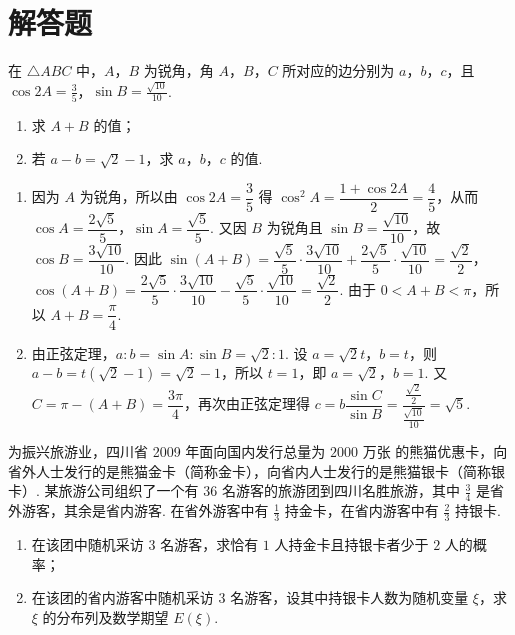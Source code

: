 \section{解答题}

\begin{problem}
在 \(\triangle ABC\) 中，\(A\)，\(B\) 为锐角，角 \(A\)，\(B\)，\(C\) 所对应的边分别为 \(a\)，\(b\)，\(c\)，且 \(\cos 2A = \frac{3}{5}\)，\(\sin B = \frac{\sqrt{10}}{10}\).

\begin{enumerate}
\item 求 \(A + B\) 的值；
\item 若 \(a - b = \sqrt{2} - 1\)，求 \(a\)，\(b\)，\(c\) 的值.
\end{enumerate}
\end{problem}

\begin{solution}
\begin{enumerate}
\item 因为 \(A\) 为锐角，所以由 \(\cos 2A=\dfrac35\) 得 \(\cos^2A=\dfrac{1+\cos2A}{2}=\dfrac45\)，从而 \(\cos A=\dfrac{2\sqrt5}{5}\)，\(\sin A=\dfrac{\sqrt5}{5}\). 又因 \(B\) 为锐角且 \(\sin B=\dfrac{\sqrt{10}}{10}\)，故 \(\cos B=\dfrac{3\sqrt{10}}{10}\). 因此 \(\sin(A+B)=\dfrac{\sqrt5}{5}\cdot\dfrac{3\sqrt{10}}{10}+\dfrac{2\sqrt5}{5}\cdot\dfrac{\sqrt{10}}{10}=\dfrac{\sqrt2}{2}\)，\(\cos(A+B)=\dfrac{2\sqrt5}{5}\cdot\dfrac{3\sqrt{10}}{10}-\dfrac{\sqrt5}{5}\cdot\dfrac{\sqrt{10}}{10}=\dfrac{\sqrt2}{2}\). 由于 \(0<A+B<\pi\)，所以 \(A+B=\dfrac{\pi}{4}\).
\item 由正弦定理，\(a:b=\sin A:\sin B=\sqrt2:1\). 设 \(a=\sqrt2t\)，\(b=t\)，则 \(a-b=t(\sqrt2-1)=\sqrt2-1\)，所以 \(t=1\)，即 \(a=\sqrt2\)，\(b=1\). 又 \(C=\pi-(A+B)=\dfrac{3\pi}{4}\)，再次由正弦定理得 \(c=b\dfrac{\sin C}{\sin B}=\dfrac{\frac{\sqrt2}{2}}{\frac{\sqrt{10}}{10}}=\sqrt5\).
\end{enumerate}
\end{solution}

\begin{problem}
为振兴旅游业，四川省 2009 年面向国内发行总量为 \(2000\text{ 万张}\) 的熊猫优惠卡，向省外人士发行的是熊猫金卡（简称金卡），向省内人士发行的是熊猫银卡（简称银卡）. 某旅游公司组织了一个有 \(36\) 名游客的旅游团到四川名胜旅游，其中 \(\frac{3}{4}\) 是省外游客，其余是省内游客. 在省外游客中有 \(\frac{1}{3}\) 持金卡，在省内游客中有 \(\frac{2}{3}\) 持银卡.

\begin{enumerate}
\item 在该团中随机采访 \(3\) 名游客，求恰有 \(1\) 人持金卡且持银卡者少于 \(2\) 人的概率；
\item 在该团的省内游客中随机采访 \(3\) 名游客，设其中持银卡人数为随机变量 \(\xi\)，求 \(\xi\) 的分布列及数学期望 \(E(\xi)\).
\end{enumerate}
\end{problem}

